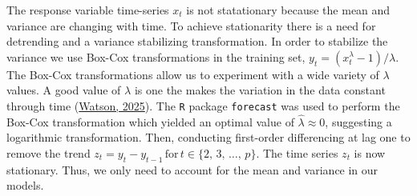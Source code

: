 \documentclass[a4paper, 10pt, fleqn]{article}
\begin{document}
\begin{flushleft}
      The response variable time-series $x_{t}$ is not statationary because the mean and variance are changing with time. To achieve stationarity there is a need for detrending and a variance stabilizing transformation. In order to stabilize the variance we use Box-Cox transformations in the training set, $y_{t} = (x_{t}^{\lambda} - 1) / \lambda$. The Box-Cox transformations allow us to experiment with a wide variety of $\lambda$ values. A good value of $\lambda$ is one the makes the variation in the data constant through time (\hyperref[Watson2025]{Watson, 2025}). The \texttt{R} package \texttt{forecast} was used to perform the Box-Cox transformation which yielded an optimal value of $\hat{\lambda} \approx 0$, suggesting a logarithmic transformation. Then, conducting first-order differencing at lag one to remove the trend $z_{t} = y_{t} - y_{t-1} \, \text{for} \, t \in \{2, \, 3, \, \ldots, \, p\}$. The time series $z_{t}$ is now stationary. Thus, we only need to account for the mean and variance in our models.      


\end{flushleft}
\end{document}
